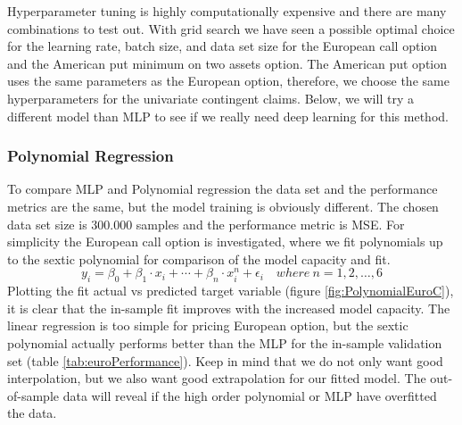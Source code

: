 Hyperparameter tuning is highly computationally expensive and there are many combinations to test out. With grid search we have seen a possible optimal choice for the learning rate, batch size, and data set size for the European call option and the American put minimum on two assets option. The American put option uses the same parameters as the European option, therefore,  we choose the same hyperparameters for the univariate contingent claims. Below, we will try a different model than MLP to see if we really need deep learning for this method. 

\subsubsection{Polynomial Regression}
To compare MLP and Polynomial regression the data set and the performance metrics are the same, but the model training is obviously different. The chosen data set size is 300.000 samples and the performance metric is MSE. For simplicity the European call option is investigated, where we fit polynomials up to the sextic polynomial for comparison of the model capacity and fit.  
$$y_i=\beta_0 + \beta_1 \cdot x_i + \cdots + \beta_n \cdot x_i^n + \epsilon_i \quad where \ n=1,2,\ldots,6$$
Plotting the fit actual vs predicted target variable (figure \ref{fig:PolynomialEuroC}), it is clear that the in-sample fit improves with the increased model capacity. The linear regression is too simple for pricing European option, but the sextic polynomial actually performs better than the MLP for the in-sample validation set (table \ref{tab:euroPerformance}). Keep in mind that we do not only want good interpolation, but we also want good extrapolation for our fitted model. The out-of-sample data will reveal if the high order polynomial or MLP have overfitted the data.\\

